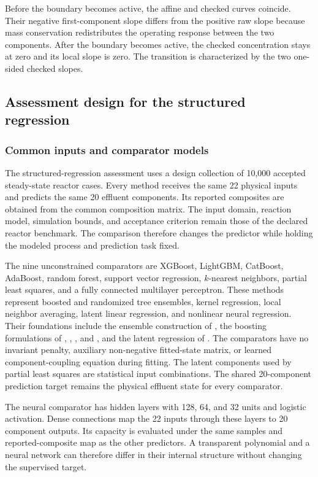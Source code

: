 Before the boundary becomes active, the affine and checked curves coincide. Their negative first-component slope differs from the positive raw slope because mass conservation redistributes the operating response between the two components. After the boundary becomes active, the checked concentration stays at zero and its local slope is zero. The transition is characterized by the two one-sided checked slopes.

\subsection{Assessment design for the structured regression}

\subsubsection{Common inputs and comparator models}

The structured-regression assessment uses a design collection of 10,000 accepted steady-state reactor cases. Every method receives the same 22 physical inputs and predicts the same 20 effluent components. Its reported composites are obtained from the common composition matrix. The input domain, reaction model, simulation bounds, and acceptance criterion remain those of the declared reactor benchmark. The comparison therefore changes the predictor while holding the modeled process and prediction task fixed.

The nine unconstrained comparators are XGBoost, LightGBM, CatBoost, AdaBoost, random forest, support vector regression, \(k\)-nearest neighbors, partial least squares, and a fully connected multilayer perceptron. These methods represent boosted and randomized tree ensembles, kernel regression, local neighbor averaging, latent linear regression, and nonlinear neural regression. Their foundations include the ensemble construction of \citet{Breiman2001}, the boosting formulations of \citet{Drucker1997}, \citet{ChenGuestrin2016}, \citet{Ke2017}, and \citet{Prokhorenkova2018}, and the latent regression of \citet{Wold2001}. The comparators have no invariant penalty, auxiliary non-negative fitted-state matrix, or learned component-coupling equation during fitting. The latent components used by partial least squares are statistical input combinations. The shared 20-component prediction target remains the physical effluent state for every comparator.

The neural comparator has hidden layers with 128, 64, and 32 units and logistic activation. Dense connections map the 22 inputs through these layers to 20 component outputs. Its capacity is evaluated under the same samples and reported-composite map as the other predictors. A transparent polynomial and a neural network can therefore differ in their internal structure without changing the supervised target.

